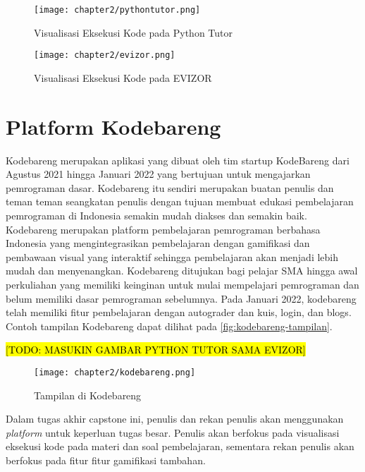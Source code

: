 \begin{figure}[H]
  \centering
  \texttt{[image: chapter2/pythontutor.png]}
  \caption{Visualisasi Eksekusi Kode pada Python Tutor} \label{fig:pythontutor}
\end{figure}

\begin{figure}[H]
  \centering
  \texttt{[image: chapter2/evizor.png]}
  \caption{Visualisasi Eksekusi Kode pada EVIZOR} \label{fig:evizor}
\end{figure}


\section{Platform Kodebareng}

Kodebareng merupakan aplikasi yang dibuat oleh tim startup KodeBareng dari Agustus 2021 hingga Januari 2022 yang bertujuan untuk mengajarkan pemrograman dasar. Kodebareng itu sendiri merupakan buatan penulis dan teman teman seangkatan penulis dengan tujuan membuat edukasi pembelajaran pemrograman di Indonesia semakin mudah diakses dan semakin baik. Kodebareng merupakan platform pembelajaran pemrograman berbahasa Indonesia yang mengintegrasikan pembelajaran dengan gamifikasi dan pembawaan visual yang interaktif sehingga pembelajaran akan menjadi lebih mudah dan menyenangkan. Kodebareng ditujukan bagi pelajar SMA hingga awal perkuliahan yang memiliki keinginan untuk mulai mempelajari pemrograman dan belum memiliki dasar pemrograman sebelumnya. Pada Januari 2022, kodebareng telah memiliki fitur pembelajaran dengan autograder dan kuis, login, dan blogs. Contoh tampilan Kodebareng dapat dilihat pada \autoref{fig:kodebareng-tampilan}.

\hl{[TODO: MASUKIN GAMBAR PYTHON TUTOR SAMA EVIZOR]}

\begin{figure}[h]
  \centering
  \texttt{[image: chapter2/kodebareng.png]}
  \caption{Tampilan di Kodebareng}\label{fig:kodebareng-tampilan}
\end{figure}

Dalam tugas akhir capstone ini, penulis dan rekan penulis akan menggunakan \textit{platform} untuk keperluan tugas besar. Penulis akan berfokus pada visualisasi eksekusi kode pada materi dan soal pembelajaran, sementara rekan penulis akan berfokus pada fitur fitur gamifikasi tambahan.